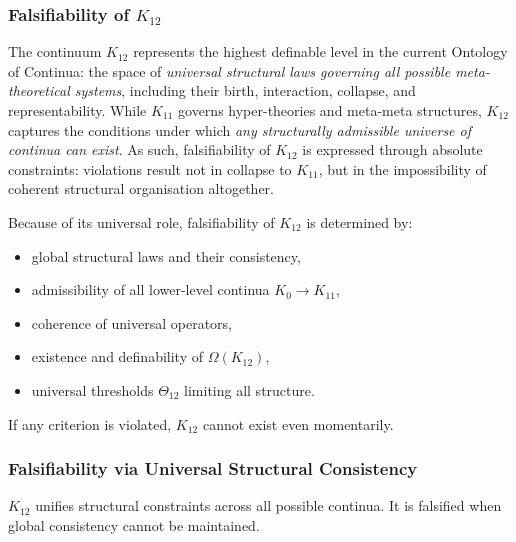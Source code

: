 
\subsubsection{Falsifiability of $K_{12}$}
\label{sec:falsifiability-k12}

The continuum $K_{12}$ represents the highest definable level in the
current Ontology of Continua: the space of \emph{universal structural
laws governing all possible meta-theoretical systems}, including their
birth, interaction, collapse, and representability. While $K_{11}$
governs hyper-theories and meta-meta structures, $K_{12}$ captures the
conditions under which \emph{any structurally admissible universe of
continua can exist}. As such, falsifiability of $K_{12}$ is expressed
through absolute constraints: violations result not in collapse to
$K_{11}$, but in the impossibility of coherent structural organisation
altogether.

Because of its universal role, falsifiability of $K_{12}$ is determined
by:

\begin{itemize}
    \item global structural laws and their consistency,
    \item admissibility of all lower-level continua $K_0 \to K_{11}$,
    \item coherence of universal operators,
    \item existence and definability of $\Omega(K_{12})$,
    \item universal thresholds $\Theta_{12}$ limiting all structure.
\end{itemize}

If any criterion is violated, $K_{12}$ cannot exist even momentarily.



\subsubsection{Falsifiability via Universal Structural Consistency}

$K_{12}$ unifies structural constraints across all possible continua.
It is falsified when global consistency cannot be maintained.

